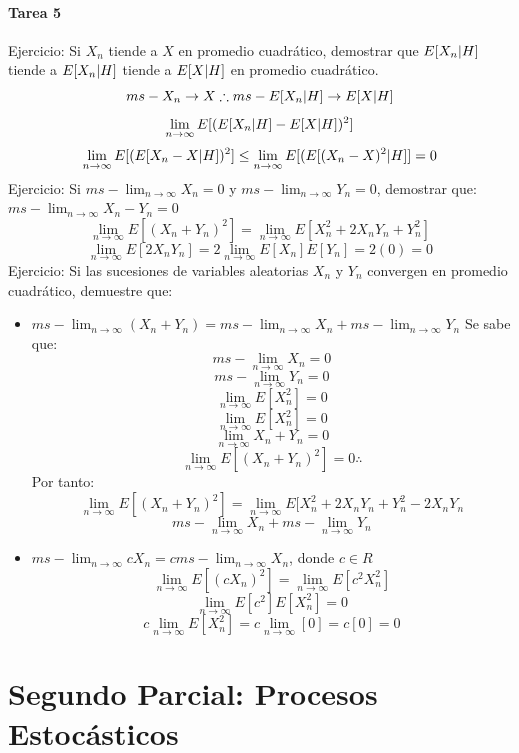\documentclass[11pt,fleqn]{book} %
\numberwithin{equation}{section} %
\numberwithin{figure}{section} %
\numberwithin{table}{section} %
\begin{document}
\subsubsection{Tarea 5}
Ejercicio: Si $X_{n}$ tiende a $X$ en promedio cuadrático, demostrar que $E[X_{n} \arrowvert H]$ tiende a $E[X_{n} \arrowvert H]$ tiende a $E[X \arrowvert H]$ en promedio cuadrático.
$$ms-X_{n} \to X \therefore ms-E[X_{n} \arrowvert H] \to E[X \arrowvert H] $$
$$ \lim_{n \to \infty} E[(E[X_{n} \arrowvert H] - E[X \arrowvert H] )^{2}] $$
$$ \lim_{n \to \infty} E[(E[X_{n} - X \arrowvert H] )^{2}] \leq \lim_{n \to \infty} E[(E[(X_{n} - X)^{2} \arrowvert H] ] = 0    $$
Ejercicio: Si $ms- \lim_{n \to \infty} X_{n} = 0$ y $ms- \lim_{n \to \infty} Y_{n} = 0$, demostrar que: $ms- \lim_{n \to \infty} X_{n} - Y_{n} = 0$
$$ \lim_{n \to \infty} E[(X_{n} + Y_{n})^{2}]  = \lim_{n \to \infty} E[X_{n}^{2} + 2X_{n}Y_{n} + Y_{n}^{2} ] $$
$$ \lim_{n \to \infty} E[2X_{n}Y_{n}]  = 2\lim_{n \to \infty} E[X_{n}]E[Y_{n}] = 2(0) = 0$$
Ejercicio: Si las sucesiones de variables aleatorias $X_{n}$ y $Y_{n}$ convergen en promedio cuadrático, demuestre que:
\begin{itemize}
    \item $ms- \lim_{n \to \infty} (X_{n} + Y_{n}) = ms- \lim_{n \to \infty} X_{n} + ms- \lim_{n \to \infty} Y_{n} $
    Se sabe que:
    $$ ms- \lim_{n \to \infty} X_{n} = 0     $$
    $$ ms- \lim_{n \to \infty} Y_{n} = 0     $$
    $$ \lim_{n \to \infty} E[X_{n}^{2}] = 0  $$
    $$ \lim_{n \to \infty} E[X_{n}^{2}] = 0  $$
    $$ \lim_{n \to \infty} X_{n} + Y_{n} = 0 $$
    $$ \lim_{n \to \infty} E[(X_{n} + Y_{n})^{2}] = 0  \therefore $$
    Por tanto:
    $$ \lim_{n \to \infty} E[(X_{n} + Y_{n})^{2}]  = \lim_{n \to \infty} E[X_{n}^{2} + 2X_{n}Y_{n} + Y_{n}^{2} - 2X_{n}Y_{n} $$
    $$ ms- \lim_{n \to \infty} X_{n} + ms- \lim_{n \to \infty} Y_{n} $$
    \item $ms- \lim_{n \to \infty} c X_{n} = c ms- \lim_{n \to \infty} X_{n}$, donde $c \in R$
    $$ \lim_{n \to \infty} E[(cX_{n})^{2}] = \lim_{n \to \infty} E[c^{2}X_{n}^{2}]       $$
    $$ \lim_{n \to \infty} E[c^2] E[X_{n}^{2}] = 0      $$
    $$ c \lim_{n \to \infty} E[X_{n}^{2}] = c \lim_{n \to \infty}[0] = c[0] = 0      $$
\end{itemize}
\chapter{Segundo Parcial: Procesos Estocásticos}
\end{document}
